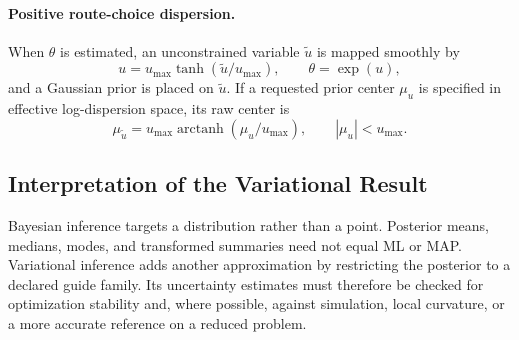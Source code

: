 



\paragraph{Positive route-choice dispersion.}
When $\theta$ is estimated, an unconstrained variable $\widetilde u$ is mapped
smoothly by
\[
 u=u_{\max}\tanh(\widetilde u/u_{\max}),
 \qquad \theta=\exp(u),
\]
and a Gaussian prior is placed on $\widetilde u$. If a requested prior center
$\mu_u$ is specified in effective log-dispersion space, its raw center is
\[
 \mu_{\widetilde u}
 =u_{\max}\operatorname{arctanh}(\mu_u/u_{\max}),
 \qquad |\mu_u|<u_{\max}.
\]


\subsection{Interpretation of the Variational Result}

Bayesian inference targets a distribution rather than a point. Posterior means,
medians, modes, and transformed summaries need not equal ML or MAP. Variational
inference adds another approximation by restricting the posterior to a declared
guide family. Its uncertainty estimates must therefore be checked for
optimization stability and, where possible, against simulation, local
curvature, or a more accurate reference on a reduced problem.
